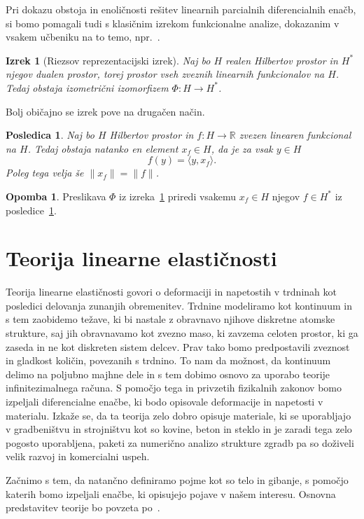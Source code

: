 \documentclass[12pt,a4paper,twoside]{article}
\theoremstyle{definition} %
\newtheorem{opomba}[definicija]{Opomba}
\theoremstyle{plain} %
\newtheorem{izrek}[definicija]{Izrek}
\newtheorem{posledica}[definicija]{Posledica}
\numberwithin{equation}{section}
\newcommand{\R}{\mathbb R}
\begin{document}
Pri dokazu obstoja in enoličnosti rešitev linearnih parcialnih diferencialnih enačb, si bomo
pomagali tudi s klasičnim izrekom funkcionalne analize, dokazanim v vsakem učbeniku na to temo,
npr.~\cite[str.\ 188, izrek 3.8-1]{kreyszig1989introductory}.
\begin{izrek}[Riezsov reprezentacijski izrek]
  \label{izr:riesz-general}
  Naj bo $H$ realen Hilbertov prostor in $H^\ast$ njegov dualen prostor, torej
  prostor vseh zveznih linearnih funkcionalov na $H$. Tedaj obstaja izometrični
  izomorfizem $\Phi\colon H\to H^\ast$.
\end{izrek}
Bolj običajno se izrek pove na drugačen način.
\begin{posledica}
  \label{izr:riesz-useful}
  Naj bo $H$ Hilbertov prostor in $f\colon H\to\R$ zvezen linearen funkcional na $H$.
  Tedaj obstaja natanko en element $x_f \in H$, da je za vsak $y \in H$
  \[ f(y) = \langle y, x_f \rangle. \]
  Poleg tega velja še $\|x_f\| = \|f\|$.
\end{posledica}
\begin{opomba}
  Preslikava $\Phi$ iz izreka~\ref{izr:riesz-general} priredi vsakemu $x_f \in
  H$ njegov $f \in H^\ast$ iz posledice~\ref{izr:riesz-useful}.
\end{opomba}

\section{Teorija linearne elastičnosti}
\label{sec:mehanika}
Teorija linearne elastičnosti govori o deformaciji in napetostih v trdninah kot posledici delovanja
zunanjih obremenitev. Trdnine modeliramo kot kontinuum in s tem zaobidemo težave, ki bi nastale z
obravnavo njihove diskretne atomske strukture, saj jih obravnavamo kot zvezno maso, ki zavzema
celoten prostor, ki ga zaseda in ne kot diskreten sistem delcev. Prav tako bomo predpostavili
zveznost in gladkost količin, povezanih s trdnino. To nam da možnost, da kontinuum delimo na
poljubno majhne dele in s tem dobimo osnovo za uporabo teorije infinitezimalnega računa. S pomočjo
tega in privzetih fizikalnih zakonov bomo izpeljali diferencialne enačbe, ki bodo opisovale
deformacije in napetosti v materialu. Izkaže se, da ta teorija zelo dobro opisuje materiale, ki se
uporabljajo v gradbeništvu in strojništvu kot so kovine, beton in steklo in je zaradi tega zelo pogosto
uporabljena, paketi za numerično analizo strukture zgradb pa so doživeli velik razvoj in komercialni
uspeh.

Začnimo s tem, da natančno definiramo pojme kot so telo in gibanje, s pomočjo katerih bomo izpeljali
enačbe, ki opisujejo pojave v našem interesu. Osnovna predstavitev teorije bo povzeta
po~\cite{slaughter2012linearized}.
\end{document}
